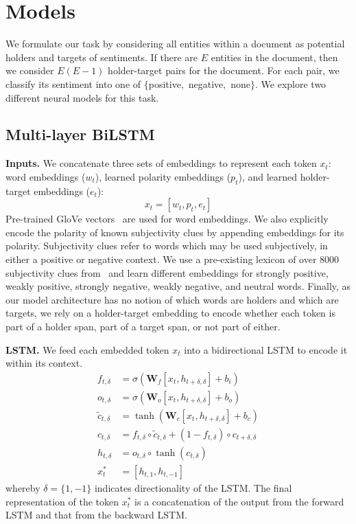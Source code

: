\documentclass[11pt,a4paper]{article}
\begin{document}
\section{Models}
We formulate our task by considering all entities within a document as potential holders and targets of sentiments. If there are $E$ entities in the document, then we consider $E(E - 1)$ holder-target pairs for the document.
For each pair, we classify its sentiment into one of $\{$positive$,$ negative$,$ none$\}$.
We explore two different neural models for this task.

\subsection{Multi-layer BiLSTM}
\noindent\textbf{Inputs.}
We concatenate three sets of embeddings to represent each token $x_t$: word embeddings ($w_t$), learned polarity embeddings ($p_t$), and learned holder-target embeddings ($e_t$):
	$$x_t = [w_t, p_t, e_t]$$
Pre-trained GloVe vectors~\cite{Pennington:14} are used for word embeddings.
We also explicitly encode the polarity of known subjectivity clues by appending embeddings for its polarity.
Subjectivity clues refer to words which may be used subjectively, in either a positive or negative context.
We use a pre-existing lexicon of over 8000 subjectivity clues from~ and learn different embeddings for strongly positive, weakly positive, strongly negative, weakly negative, and neutral words.
Finally, as our model architecture has no notion of which words are holders and which are targets, we rely on a holder-target embedding to encode whether each token is part of a holder span, part of a target span, or not part of either.

\noindent\textbf{LSTM.}
We feed each embedded token $x_t$ into a bidirectional LSTM to encode it within its context.
\begin{align*}
f_{t, \delta} & = \sigma(\textbf{W}_f [x_t, h_{t + \delta, \delta}] + b_i) \\
o_{t, \delta} & = \sigma(\textbf{W}_o[x_t, h_{t + \delta,\delta}] + b_o) \\
\tilde{c}_{t, \delta} & = \tanh(\textbf{W}_c[x_t, h_{t + \delta, \delta}] + b_c) \\
c_{t, \delta} & = f_{t, \delta}\circ \tilde{c}_{t, \delta} + (1 - f_{t, \delta})\circ c_{t + \delta, \delta} \\
h_{t, \delta} & = o_{t, \delta}\circ \tanh(c_{t,\delta}) \\
x^*_t & = [h_{t, 1}, h_{t, -1}]
\end{align*}
whereby $\delta = \{1, -1\}$ indicates directionality of the LSTM.
The final representation of the token $x_t^*$ is a concatenation of the output from the forward LSTM and that from the backward LSTM.
\end{document}
